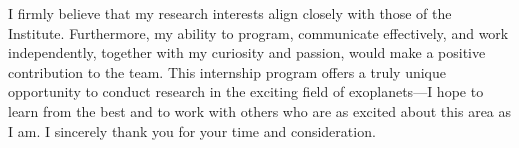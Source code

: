 \documentclass[10pt]{res}
\begin{document}
\begin{resume}
I firmly believe that my research interests align closely with those of the Institute. Furthermore, my ability to program, communicate effectively, and work independently, together with my curiosity and passion, would make a positive contribution to the team. This internship program offers a truly unique opportunity to conduct research in the exciting field of exoplanets—I hope to learn from the best and to work with others who are as excited about this area as I am. I sincerely thank you for your time and consideration. 

\end{resume}
\end{document}
